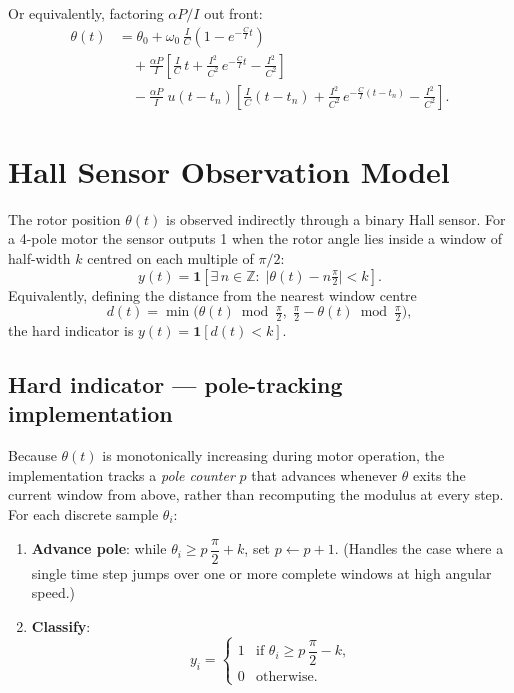 \documentclass[11pt,a4paper]{article}
\begin{document}
Or equivalently, factoring $\alpha P / I$ out front:
\[
\begin{aligned}
  \theta(t)
  &= \theta_0
   + \omega_0\,\frac{I}{C}\!\left(1 - e^{-\frac{C}{I}t}\right) \\[6pt]
  &\quad + \frac{\alpha P}{I}\left[
      \frac{I}{C}\,t
      + \frac{I^2}{C^2}\,e^{-\frac{C}{I}t}
      - \frac{I^2}{C^2}
    \right] \\[6pt]
  &\quad - \frac{\alpha P}{I}\;u(t-t_n)\left[
      \frac{I}{C}(t-t_n)
      + \frac{I^2}{C^2}\,e^{-\frac{C}{I}(t-t_n)}
      - \frac{I^2}{C^2}
    \right].
\end{aligned}
\]

\section{Hall Sensor Observation Model}

The rotor position $\theta(t)$ is observed indirectly through a binary Hall
sensor.  For a 4-pole motor the sensor outputs 1 when the rotor angle lies
inside a window of half-width $k$ centred on each multiple of $\pi/2$:
\begin{equation}\label{eq:hall_hard}
  y(t) = \mathbf{1}\!\left[
    \exists\, n\in\mathbb{Z}:\;
    \bigl|\theta(t) - n\tfrac{\pi}{2}\bigr| < k
  \right].
\end{equation}
Equivalently, defining the distance from the nearest window centre
\begin{equation}
  d(t) = \min\!\bigl(\theta(t)\bmod\tfrac{\pi}{2},\;
                     \tfrac{\pi}{2} - \theta(t)\bmod\tfrac{\pi}{2}\bigr),
\end{equation}
the hard indicator is $y(t)=\mathbf{1}[d(t)<k]$.

\subsection{Hard indicator — pole-tracking implementation}

Because $\theta(t)$ is monotonically increasing during motor operation, the
implementation tracks a \emph{pole counter} $p$ that advances whenever
$\theta$ exits the current window from above, rather than recomputing the
modulus at every step.  For each discrete sample $\theta_i$:

\begin{enumerate}
  \item \textbf{Advance pole}: while $\theta_i \ge p\,\dfrac{\pi}{2} + k$,
        set $p \leftarrow p + 1$.
        (Handles the case where a single time step jumps over one or more
        complete windows at high angular speed.)
  \item \textbf{Classify}:
        \[
          y_i =
          \begin{cases}
            1 & \text{if } \theta_i \ge p\,\dfrac{\pi}{2} - k, \\
            0 & \text{otherwise.}
          \end{cases}
        \]
\end{enumerate}
\end{document}
